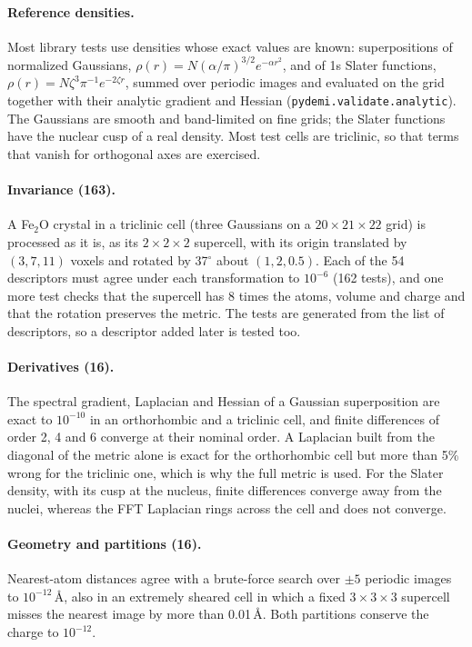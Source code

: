 \documentclass[journal=jctcce,manuscript=suppinfo,email=true]{achemso}
\newcommand{\rev}[1]{{\color{blue}#1}}
\begin{document}
\paragraph{Reference densities.} Most library tests use densities whose exact
values are known: superpositions of normalized Gaussians,
$\rho(r)=N(\alpha/\pi)^{3/2}e^{-\alpha r^2}$, and of 1s Slater functions,
$\rho(r)=N\zeta^3\pi^{-1}e^{-2\zeta r}$, summed over periodic images and
evaluated on the grid together with their analytic gradient and Hessian
(\texttt{pydemi.validate.analytic}). The Gaussians are smooth and band-limited
on fine grids; the Slater functions have the nuclear cusp of a real density.
Most test cells are triclinic, so that terms that vanish for orthogonal axes are
exercised.

\paragraph{Invariance (\rev{163}).} A Fe$_2$O crystal in a triclinic cell
(three Gaussians on a $20\times21\times22$ grid) is processed as it is, as its
$2\times2\times2$ supercell, with its origin translated by $(3,7,11)$ voxels and
rotated by 37$^\circ$ about $(1,2,0.5)$. Each of the \rev{54} descriptors must agree
under each transformation to $10^{-6}$ (\rev{162} tests), and one more test checks
that the supercell has 8 times the atoms, volume and charge and that the
rotation preserves the metric. The tests are generated from the list of
descriptors, so a descriptor added later is tested too.

\paragraph{Derivatives (16).} The spectral gradient, Laplacian and
Hessian of a Gaussian superposition are exact to $10^{-10}$ in an orthorhombic
and a triclinic cell, and finite differences of order 2, 4 and 6 converge at
their nominal order. A Laplacian built from the diagonal of the metric alone is
exact for the orthorhombic cell but more than 5\% wrong for the triclinic one,
which is why the full metric is used. For the Slater density, with its cusp at
the nucleus, finite differences converge away from the nuclei, whereas the FFT
Laplacian rings across the cell and does not converge.

\paragraph{Geometry and partitions (\rev{16}).} Nearest-atom distances
agree with a brute-force search over $\pm5$ periodic images to
$10^{-12}$\,\AA{}, also in an extremely sheared cell in which a fixed
$3\times3\times3$ supercell misses the nearest image by more than 0.01\,\AA{}.
\rev{Both} partitions conserve the charge to $10^{-12}$.
\end{document}
